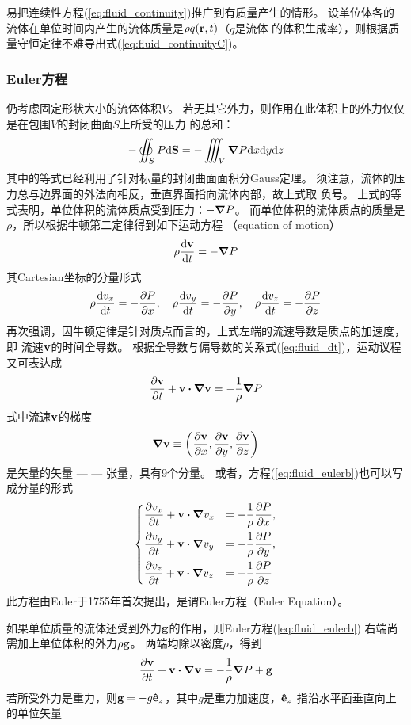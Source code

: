 \documentclass[UTF8]{ctexbook}
\begin{document}
易把连续性方程(\ref{eq:fluid_continuity})推广到有质量产生的情形。
设单位体各的流体在单位时间内产生的流体质量是$\rho q(\vb{r},t)$（$q$是流体
的体积生成率），则根据质量守恒定律不难导出式(\ref{eq:fluid_continuityC})。


\subsubsection{Euler方程}
仍考虑固定形状大小的流体体积$V$。
若无其它外力，则作用在此体积上的外力仅仅是在包围$V$的封闭曲面$S$上所受的压力
的总和：
$$-\oiint_S P\dd\vb{S} = -\iiint_V \grad P \dd x \dd y \dd z$$
其中的等式已经利用了针对标量的封闭曲面面积分Gauss定理。
须注意，流体的压力总与边界面的外法向相反，垂直界面指向流体内部，故上式取
负号。
上式的等式表明，单位体积的流体质点受到压力：$-\grad P$。
而单位体积的流体质点的质量是$\rho$，所以根据牛顿第二定律得到如下运动方程
（equation of motion）
\begin{equation}
	\rho \dv{\vb{v}}{t} = -\grad P
	\label{eq:fluid_eulera}
\end{equation}
其Cartesian坐标的分量形式
$$\rho \dv{v_x}{t} = -\pdv{P}{x}\qc \rho \dv{v_y}{t} = -\pdv{P}{y}\qc
\rho \dv{v_z}{t} = -\pdv{P}{z}$$
再次强调，因牛顿定律是针对质点而言的，上式左端的流速导数是质点的加速度，即
流速$\vb{v}$的时间全导数。
根据全导数与偏导数的关系式(\ref{eq:fluid_dt})，运动议程又可表达成
\begin{equation}
	\pdv{\vb{v}}{t} +\vb{v}\vdot \grad \vb{v} = -\frac1\rho \grad P
	\label{eq:fluid_eulerb}
\end{equation}
式中流速$\vb{v}$的梯度
$$\grad \vb{v} \equiv \qty(\pdv{\vb{v}}{x}, \pdv{\vb{v}}{y},\pdv{\vb{v}}{z})
$$
是矢量的矢量 --- --- 张量，具有9个分量。
或者，方程(\ref{eq:fluid_eulerb})也可以写成分量的形式
$$
\begin{dcases}
	\pdv{v_x}{t} + \vb{v}\vdot \grad v_x&=-\frac1\rho \pdv{P}{x},\\
	\pdv{v_y}{t} + \vb{v}\vdot \grad v_y&=-\frac1\rho \pdv{P}{y},\\
	\pdv{v_z}{t} + \vb{v}\vdot \grad v_z&=-\frac1\rho \pdv{P}{z}
\end{dcases}
$$
此方程由Euler于1755年首次提出，是谓Euler方程（Euler Equation）。


如果单位质量的流体还受到外力$\vb{g}$的作用，则Euler方程(\ref{eq:fluid_eulerb})
右端尚需加上单位体积的外力$\rho \vb{g}$。
两端均除以密度$\rho$，得到
\begin{equation}
	\pdv{\vb{v}}{t} + \vb{v}\vdot \grad \vb{v} =-\frac1\rho \grad P + \vb{g}
	\label{eq:fluid_eulerc}
\end{equation}
若所受外力是重力，则$\vb{g}=-g\vu{e}_z$，其中$g$是重力加速度，$\vu{e}_z$
指沿水平面垂直向上的单位矢量
\end{document}
